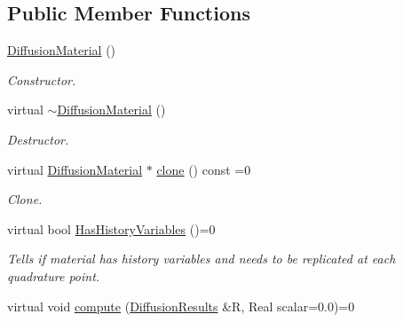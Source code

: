 \subsection*{Public Member Functions}
\begin{DoxyCompactItemize}
\item 
\hypertarget{classvoom_1_1_diffusion_material_a975432e8c21754a21722cf543a8e0fa8}{
\hyperlink{classvoom_1_1_diffusion_material_a975432e8c21754a21722cf543a8e0fa8}{DiffusionMaterial} ()}
\label{classvoom_1_1_diffusion_material_a975432e8c21754a21722cf543a8e0fa8}

\begin{DoxyCompactList}\small\item\em Constructor. \item\end{DoxyCompactList}\item 
\hypertarget{classvoom_1_1_diffusion_material_a9dc39ce594d4ba8cfc3ed462b09222b8}{
virtual \hyperlink{classvoom_1_1_diffusion_material_a9dc39ce594d4ba8cfc3ed462b09222b8}{$\sim$DiffusionMaterial} ()}
\label{classvoom_1_1_diffusion_material_a9dc39ce594d4ba8cfc3ed462b09222b8}

\begin{DoxyCompactList}\small\item\em Destructor. \item\end{DoxyCompactList}\item 
\hypertarget{classvoom_1_1_diffusion_material_a9476e80b89f5eeb0df01a0ddab85bb32}{
virtual \hyperlink{classvoom_1_1_diffusion_material}{DiffusionMaterial} $\ast$ \hyperlink{classvoom_1_1_diffusion_material_a9476e80b89f5eeb0df01a0ddab85bb32}{clone} () const =0}
\label{classvoom_1_1_diffusion_material_a9476e80b89f5eeb0df01a0ddab85bb32}

\begin{DoxyCompactList}\small\item\em Clone. \item\end{DoxyCompactList}\item 
\hypertarget{classvoom_1_1_diffusion_material_a2a5f770fbea6e4f2b0d49dd31b55ce09}{
virtual bool \hyperlink{classvoom_1_1_diffusion_material_a2a5f770fbea6e4f2b0d49dd31b55ce09}{HasHistoryVariables} ()=0}
\label{classvoom_1_1_diffusion_material_a2a5f770fbea6e4f2b0d49dd31b55ce09}

\begin{DoxyCompactList}\small\item\em Tells if material has history variables and needs to be replicated at each quadrature point. \item\end{DoxyCompactList}\item 
\hypertarget{classvoom_1_1_diffusion_material_a62b4befb5118b46ba5fd4c9fe871b0f4}{
virtual void \hyperlink{classvoom_1_1_diffusion_material_a62b4befb5118b46ba5fd4c9fe871b0f4}{compute} (\hyperlink{structvoom_1_1_diffusion_material_1_1_diffusion_results}{DiffusionResults} \&R, Real scalar=0.0)=0}
\label{classvoom_1_1_diffusion_material_a62b4befb5118b46ba5fd4c9fe871b0f4}


\end{DoxyCompactItemize}
